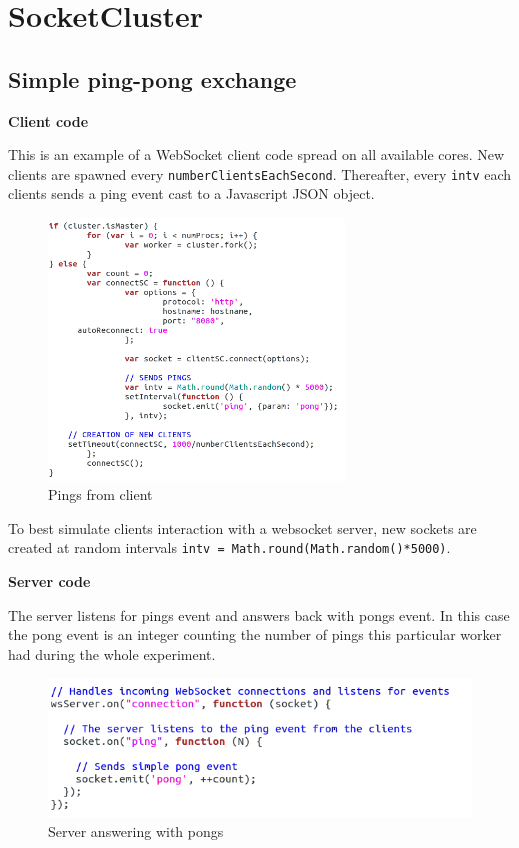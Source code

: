 \chapter{SocketCluster}
\label{SocketCluster}
\section{Simple ping-pong exchange}
\textbf{Client code}


This is an example of a WebSocket client code spread on all available cores.
New clients are spawned every \texttt{numberClientsEachSecond}. Thereafter,
every \texttt{intv} each clients sends a ping event cast to a Javascript JSON
object.

\begin{figure}[H]
	\centering
		\includegraphics[width=0.7\textwidth]{./Figures/WS_client_simplePing.png}
	\caption[Simple WebSocket client code]{Pings from client}
	\label{fig:WS_client_simplePing}
\end{figure}

To best simulate clients interaction with a websocket server, new sockets are
created at random intervals \texttt{intv = Math.round(Math.random()*5000)}.

\textbf{Server code}

The server listens for pings event and answers back with pongs event. In this
case the pong event is an integer counting the number of pings this particular
worker had during the whole experiment.

\begin{figure}[H]
	\centering
    \includegraphics[width=\textwidth]{./Figures/WS_server_simplePong.png}
	\caption[Simple WebSocket server code]{Server answering with pongs}
	\label{fig:WS_server_simplePong}
\end{figure}


